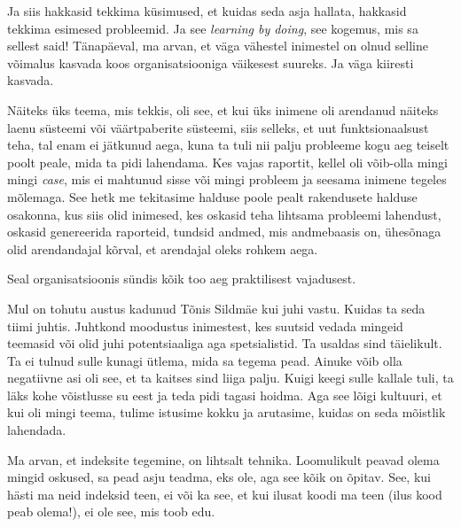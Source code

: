 Ja siis hakkasid tekkima küsimused,  et kuidas seda asja hallata, hakkasid tekkima esimesed probleemid. Ja see \emph{learning by doing}, see kogemus, mis sa sellest said! Tänapäeval, ma arvan, et väga vähestel inimestel on olnud selline võimalus kasvada koos organisatsiooniga väikesest suureks. Ja väga kiiresti kasvada. 

Näiteks üks teema, mis tekkis, oli see, et kui üks inimene oli arendanud näiteks laenu süsteemi või väärtpaberite süsteemi, siis selleks, et uut funktsionaalsust teha, tal enam ei jätkunud aega, kuna ta tuli nii palju probleeme kogu aeg teiselt poolt peale, mida ta pidi lahendama. Kes vajas raportit, kellel oli võib-olla mingi mingi \emph{case},  mis ei mahtunud sisse või mingi  probleem ja seesama inimene tegeles mõlemaga. See hetk me  tekitasime halduse poole pealt rakendusete halduse osakonna, kus siis olid inimesed, kes oskasid teha lihtsama probleemi lahendust, oskasid genereerida raporteid, tundsid andmed, mis andmebaasis on, ühesõnaga olid arendandajal kõrval, et arendajal oleks rohkem aega. 


Seal organisatsioonis sündis kõik too aeg praktilisest vajadusest. 

Mul on tohutu austus kadunud Tõnis Sildmäe kui juhi vastu. Kuidas ta seda tiimi juhtis. Juhtkond moodustus inimestest, kes suutsid vedada mingeid teemasid või olid juhi potentsiaaliga aga spetsialistid. Ta usaldas sind täielikult. Ta ei tulnud sulle kunagi ütlema, mida sa tegema pead. Ainuke võib olla negatiivne asi oli see, et ta kaitses sind liiga palju. Kuigi keegi sulle kallale tuli, ta läks kohe võistlusse su eest ja teda pidi tagasi hoidma. Aga see lõigi  kultuuri, et kui oli mingi teema, tulime istusime kokku ja arutasime, kuidas on seda mõistlik lahendada. 


Ma arvan, et indeksite tegemine, on lihtsalt tehnika. Loomulikult peavad olema mingid oskused, sa pead asju teadma, eks ole, aga see kõik on õpitav. See, kui hästi ma neid indeksid teen, ei või ka see, et kui ilusat koodi ma teen (ilus kood peab olema!), ei ole see, mis toob edu. 

